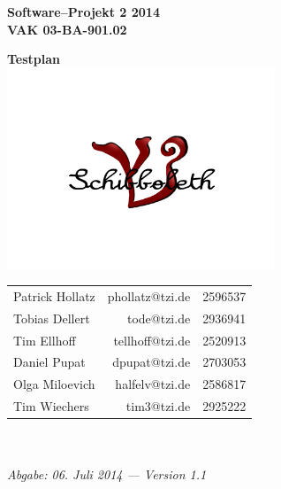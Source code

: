 \documentclass[fontsize=12pt,paper=a4,twoside]{scrartcl}
\begin{document}
  \thispagestyle{fancy}
  \fancyhead[LO,RE]{ }
  \fancyfoot[C]{}

  \vspace{3cm}

  \begin{minipage}[H]{\textwidth}
  \begin{center}
  \bf
  \Large
  Software--Projekt 2 2014\\
  \smallskip
  \small
  VAK 03-BA-901.02\\
  \vspace{3cm}
  \end{center}
  \end{minipage}
  \begin{minipage}[H]{\textwidth}
  \begin{center}
  \vspace{1cm}
  \bf
  \Large Testplan\\
  \includegraphics[width=0.6\textwidth]{Bilder/Logo.png}
  \vfill
  \end{center}
  \end{minipage}
  \vfill
  \begin{minipage}[H]{\textwidth}
  \begin{center}
  \sf
  \begin{tabular}{lrr}
  Patrick Hollatz & phollatz@tzi.de & 2596537 \\
  Tobias Dellert & tode@tzi.de & 2936941 \\
  Tim Ellhoff & tellhoff@tzi.de & 2520913\\
  Daniel Pupat & dpupat@tzi.de & 2703053 \\
  Olga Miloevich & halfelv@tzi.de  & 2586817\\  
  Tim Wiechers & tim3@tzi.de & 2925222 \\

  \end{tabular}
  \\ ~
  \vspace{2cm}
  \\
  \it Abgabe: 06. Juli 2014 --- Version 1.1\\ ~
  \end{center}
  \end{minipage}
\end{document}

